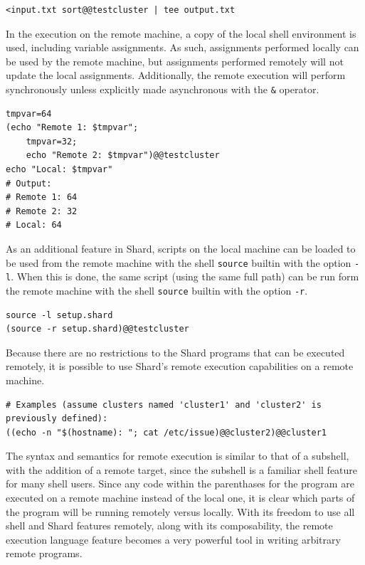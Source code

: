 \documentclass[twoside]{report}
\begin{document}
\begin{lstlisting}[language=Shard]
<input.txt sort@@testcluster | tee output.txt
\end{lstlisting}

In the execution on the remote machine, a copy of the local shell environment is used, including variable assignments.
As such, assignments performed locally can be used by the remote machine, but assignments performed remotely will not update the local assignments.
Additionally, the remote execution will perform synchronously unless explicitly made asynchronous with the \texttt{\&} operator.

\begin{lstlisting}[language=Shard]
tmpvar=64
(echo "Remote 1: $tmpvar";
    tmpvar=32;
    echo "Remote 2: $tmpvar")@@testcluster
echo "Local: $tmpvar"
# Output:
# Remote 1: 64
# Remote 2: 32
# Local: 64
\end{lstlisting}

As an additional feature in Shard, scripts on the local machine can be loaded to be used from the remote machine with the shell \texttt{source} builtin with the option \texttt{-l}.
When this is done, the same script (using the same full path) can be run form the remote machine with the shell \texttt{source} builtin with the option \texttt{-r}.

\begin{lstlisting}[language=Shard]
source -l setup.shard
(source -r setup.shard)@@testcluster
\end{lstlisting}

Because there are no restrictions to the Shard programs that can be executed remotely, it is possible to use Shard's remote execution capabilities on a remote machine.

\begin{lstlisting}[language=Shard]
# Examples (assume clusters named 'cluster1' and 'cluster2' is previously defined):
((echo -n "$(hostname): "; cat /etc/issue)@@cluster2)@@cluster1
\end{lstlisting}

The syntax and semantics for remote execution is similar to that of a subshell, with the addition of a remote target, since the subshell is a familiar shell feature for many shell users.
Since any code within the parenthases for the program are executed on a remote machine instead of the local one, it is clear which parts of the program will be running remotely versus locally.
With its freedom to use all shell and Shard features remotely, along with its composability, the remote execution language feature becomes a very powerful tool in writing arbitrary remote programs.
\end{document}
